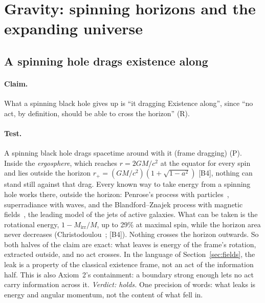 \documentclass[11pt,a4paper]{article}
\theoremstyle{definition}
\newcommand{\chk}[1]{\textsf{[#1]}}
\newcommand{\tagR}{\textsf{(R)}}
\newcommand{\tagP}{\textsf{(P)}}
\begin{document}
\section{Gravity: spinning horizons and the expanding universe}\label{sec:gravity}

\subsection{A spinning hole drags existence along}\label{sec:kerr}

\paragraph{Claim.} What a spinning black hole gives up is ``it dragging Existence along'', since ``no act, by definition, should be able to
cross the horizon'' \tagR.

\paragraph{Test.} A spinning black hole drags spacetime around with it (frame dragging) \tagP. Inside the \emph{ergosphere}, which reaches
$r=2GM/c^2$ at the equator for every spin and lies outside the horizon $r_+=(GM/c^2)(1+\sqrt{1-a^2})$ \chk{B4}, nothing can stand still
against that drag. Every known way to take energy from a spinning hole works there, outside the horizon: Penrose's process with
particles~\cite{penrose69}, superradiance with waves, and the Blandford--Znajek process with magnetic fields~\cite{bz}, the leading model of
the jets of active galaxies. What can be taken is the rotational energy, $1-M_{\text{irr}}/M$, up to 29\% at maximal spin, while the horizon
area never decreases (Christodoulou~\cite{christodoulou}; \chk{B4}). Nothing crosses the horizon outwards. So both halves of the claim are
exact: what leaves is energy of the frame's rotation, extracted outside, and no act crosses. In the language of Section~\ref{sec:fields},
the leak is a property of the classical existence frame, not an act of the information half. This is also Axiom~2's containment: a
boundary strong enough lets no act carry information across it. \emph{Verdict: holds.} One precision of words: what leaks is energy and
angular momentum, not the content of what fell in.
\end{document}
